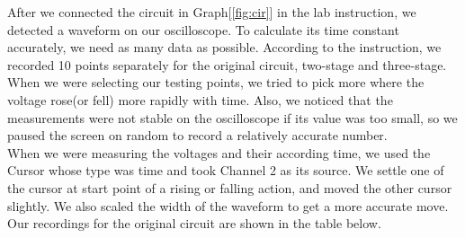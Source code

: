 \hfill \newline
\phantom{ } After we connected the circuit in Graph[\ref{fig:cir}] in the lab instruction, we detected a waveform on our oscilloscope. To calculate its time constant accurately, we need as many data as possible. According to the instruction, we recorded 10 points separately for the original circuit, two-stage and three-stage. When we were selecting our testing points, we tried to pick more where the voltage rose(or fell) more rapidly with time. Also, we noticed that the measurements were not stable on the oscilloscope if its value was too small, so we paused the screen on random to record a relatively accurate number.\\
\phantom{ } When we were measuring the voltages and their according time, we used the Cursor whose type was time and took Channel 2 as its source. We settle one of the cursor at start point of a rising or falling action, and moved the other cursor slightly. We also scaled the width of the waveform to get a more accurate move.\\
\phantom{ } Our recordings for the original circuit are shown in the table below.

